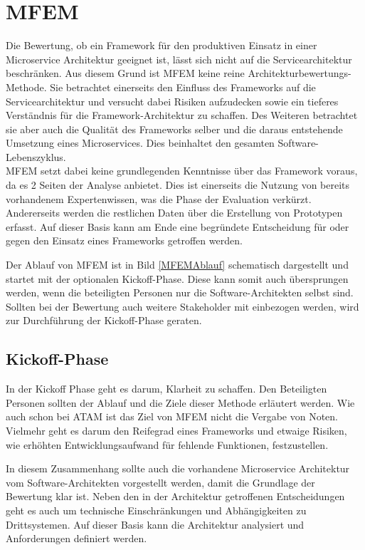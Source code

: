 \section{\acf*{MFEM}}

Die Bewertung, ob ein Framework für den produktiven Einsatz in einer Microservice Architektur geeignet ist, lässt sich nicht auf die Servicearchitektur beschränken. Aus diesem Grund ist \ac{MFEM} keine reine Architekturbewertungs-Methode. Sie betrachtet einerseits den Einfluss des Frameworks auf die Servicearchitektur und versucht dabei Risiken aufzudecken sowie ein tieferes Verständnis für die Framework-Architektur zu schaffen. Des Weiteren betrachtet sie aber auch die Qualität des Frameworks selber und die daraus entstehende Umsetzung eines Microservices. Dies beinhaltet den gesamten Software-Lebenszyklus.\\
\ac{MFEM} setzt dabei keine grundlegenden Kenntnisse über das Framework voraus, da es 2 Seiten der Analyse anbietet. Dies ist einerseits die Nutzung von bereits vorhandenem Expertenwissen, was die Phase der Evaluation verkürzt. Andererseits werden die restlichen Daten über die Erstellung von Prototypen erfasst.
Auf dieser Basis kann am Ende eine begründete Entscheidung für oder gegen den Einsatz eines Frameworks getroffen werden.

Der Ablauf von \ac{MFEM} ist in Bild \ref{MFEMAblauf} schematisch dargestellt und startet mit der optionalen Kickoff-Phase. Diese kann somit auch übersprungen werden, wenn die beteiligten Personen nur die Software-Architekten selbst sind. Sollten bei der Bewertung auch weitere Stakeholder mit einbezogen werden, wird zur Durchführung der Kickoff-Phase geraten.


\subsection{Kickoff-Phase}

In der Kickoff Phase geht es darum, Klarheit zu schaffen. Den Beteiligten Personen sollten der Ablauf und die Ziele dieser Methode erläutert werden. Wie auch schon bei \ac{ATAM} ist das Ziel von \ac{MFEM} nicht die Vergabe von Noten. Vielmehr geht es darum den Reifegrad eines Frameworks und etwaige Risiken, wie erhöhten Entwicklungsaufwand für fehlende Funktionen, festzustellen. 

In diesem Zusammenhang sollte auch die vorhandene Microservice Architektur vom Software-Architekten vorgestellt werden, damit die Grundlage der Bewertung klar ist. Neben den in der Architektur getroffenen Entscheidungen geht es auch um technische Einschränkungen und Abhängigkeiten zu Drittsystemen. Auf dieser Basis kann die Architektur analysiert und Anforderungen definiert werden.

